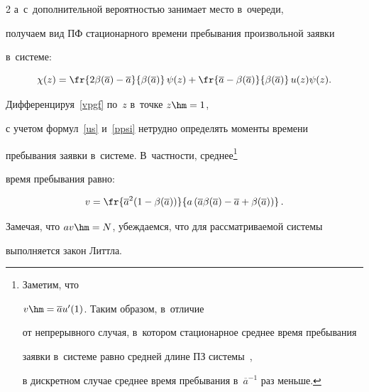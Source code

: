 \begin{multicols}{2}
а~с~дополнительной вероятностью занимает место в~очереди,

получаем вид ПФ стационарного времени пребывания произвольной заявки

в~системе:

\begin{equation}

\label{vpgf}

\chi(z)=\fr{ 2\beta(\overline{a})-\overline{a}}{\beta(\overline{a})}\, \psi(z) +

\fr{ \overline{a} - \beta(\overline{a}) }{\beta(\overline{a})} \,u(z) \psi(z).

\end{equation}



\vspace*{-6pt}



\pagebreak



Дифференцируя~\eqref{vpgf} по~$z$ в~точке $z\hm=1$,

с учетом формул~\eqref{us} и~\eqref{ppsi} нетрудно определять моменты времени

пребывания заявки в~системе. В~частности, среднее\footnote{Заметим, что

$v\hm=\overline{a} u'(1)$. Таким образом, в~отличие

от непрерывного случая, в~котором стационарное среднее время пребывания

заявки в~системе равно средней длине ПЗ системы~\cite[Corollary~2]{Mat-2},

в дискретном случае среднее время пребывания в~$\overline{a}^{-1}$ раз меньше.}

 время пребывания равно:

 \noindent

\begin{equation}

\label{vre}

v=\fr{\overline{a}^2 (1- \beta(\overline{a}))}

{ a \left (\overline{a}

 \beta(\overline{a})- \overline{a} + \beta(\overline{a})\right )}\,.

\end{equation}

Замечая, что $av\hm=N$, убеждаемся, что для рас\-смат\-ри\-ва\-емой системы

выполняется закон Литтла.




\end{multicols}
